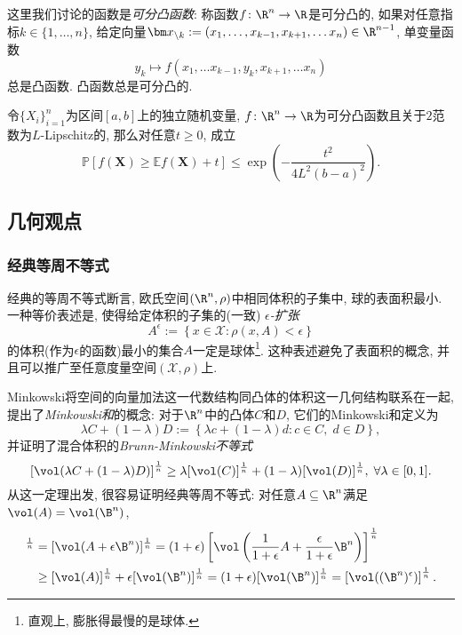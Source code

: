 这里我们讨论的函数是\emph{可分凸函数}: 称函数$f \colon \R^n \to \R$是可分凸的, 如果对任意指标$k \in \{1, \dots, n\}$, 给定向量$\bm x_{\backslash k} := (x_1, \dots, x_{k-1}, x_{k+1}, \dots x_n) \in \R^{n-1}$, 单变量函数
\begin{equation*}
	y_k \mapsto f(x_1, \dots x_{k-1}, y_k, x_{k+1}, \dots x_n)
\end{equation*}
总是凸函数. 
凸函数总是可分凸的. 

\begin{theorem}
	令$\{X_i\}_{i=1}^n$为区间$[a, b]$上的独立随机变量, $f \colon \R^n \to \R$为可分凸函数且关于$2$范数为$L$-Lipschitz的, 那么对任意$t \geq 0$, 成立
	\begin{equation*}
		\mathbb{P}[f(\bm X) \geq \mathbb{E}f(\bm X) + t] 
		\leq \exp \left( - \frac{t^2}{4L^2 (b-a)^2} \right). 
	\end{equation*}
\end{theorem}


\subsection{几何观点}

\subsubsection{经典等周不等式}

经典的等周不等式断言, 欧氏空间$(\R^n, \rho)$中相同体积的子集中, 球的表面积最小. 
一种等价表述是, 使得给定体积的子集的(一致) \emph{$\epsilon$-扩张}
\begin{equation*}
	A^{\epsilon} := \left\{ x \in \mathcal{X} \colon \rho(x, A) < \epsilon \right\}
\end{equation*}
的体积(作为$\epsilon$的函数)最小的集合$A$一定是球体\footnote{直观上, 膨胀得最慢的是球体.}.  
这种表述避免了表面积的概念, 并且可以推广至任意度量空间$(\mathcal{X}, \rho)$上. 

Minkowski将空间的向量加法这一代数结构同凸体的体积这一几何结构联系在一起, 提出了\emph{Minkowski和}的概念: 
对于$\R^n$中的凸体$C$和$D$, 它们的Minkowski和定义为
\begin{equation*}
	\lambda C + (1 - \lambda) D := \left\{ \lambda c + (1 - \lambda) d \colon c \in C,\; d \in D \right\}, 
\end{equation*}
并证明了混合体积的\emph{Brunn-Minkowski不等式}
\begin{equation*}
	\left[ \vol(\lambda C + (1-\lambda) D)  \right]^{\frac1n}
	\geq \lambda [\vol(C)]^{\frac1n} + (1-\lambda) [\vol(D)]^{\frac1n},\;
	\forall \lambda \in [0,1]. 
\end{equation*}
从这一定理出发, 很容易证明经典等周不等式: 对任意$A \subseteq \R^n$满足$\vol(A) = \vol(\B^n)$, 
\begin{align*}
	[\vol(A^{\epsilon})]^{\frac1n}
	&= [\vol(A + \epsilon \B^n)]^{\frac1n}
	= (1+\epsilon) \left[\vol\left(\frac{1}{1+\epsilon} A + \frac{\epsilon}{1+\epsilon} \B^n\right)\right]^{\frac1n} \\
	&\geq [\vol(A)]^{\frac1n} + \epsilon [\vol(\B^n)]^{\frac1n} 
	= (1+\epsilon) [\vol(\B^n)]^{\frac1n} 
	= \left[ \vol((\B^n)^{\epsilon}) \right]^{\frac1n}. 
\end{align*}

